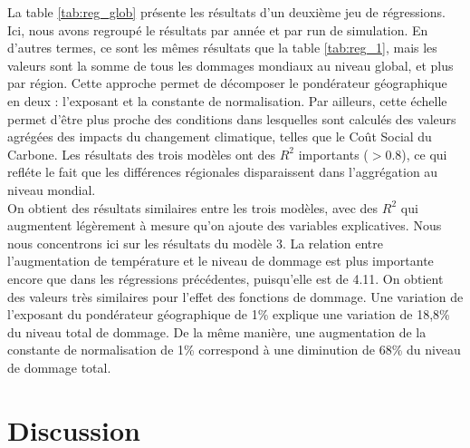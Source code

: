 La table \ref{tab:reg_glob} présente les résultats d'un deuxième jeu de régressions. Ici, nous avons regroupé le résultats par année et par run de simulation. En d'autres termes, ce sont les mêmes résultats que la table \ref{tab:reg_1}, mais les valeurs sont la somme de tous les dommages mondiaux au niveau global, et plus par région. Cette approche permet de décomposer le pondérateur géographique en deux : l'exposant et la constante de normalisation. Par ailleurs, cette échelle permet d'être plus proche des conditions dans lesquelles sont calculés des valeurs agrégées des impacts du changement climatique, telles que le Coût Social du Carbone. Les résultats des trois modèles ont des $R^2$ importants ($>0.8$), ce qui refléte le fait que les différences régionales disparaissent dans l'aggrégation au niveau mondial. \\

On obtient des résultats similaires entre les trois modèles, avec des $R^2$ qui augmentent légèrement à mesure qu'on ajoute des variables explicatives. Nous nous concentrons ici sur les résultats du modèle 3. La relation entre l'augmentation de température et le niveau de dommage est plus importante encore que dans les régressions précédentes, puisqu'elle est de 4.11. On obtient des valeurs très similaires pour l'effet des fonctions de dommage. Une variation de l'exposant du pondérateur géographique de 1\% explique une variation de 18,8\% du niveau total de dommage. De la même manière, une augmentation de la constante de normalisation de 1\% correspond à une diminution de 68\% du niveau de dommage total. 


\section{Discussion}







